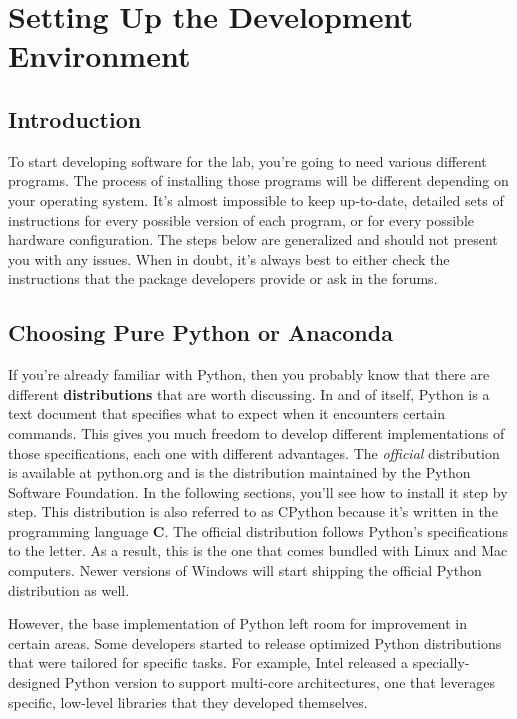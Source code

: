 \chapter[Setting Up]{Setting Up the Development Environment}\label{ch:setting-up}
\section{Introduction}\label{sec:setting-up-introduction}
To start developing software for the lab, you're going to need various different programs. The process of installing those programs will be different depending on your operating system. It's almost impossible to keep up-to-date, detailed sets of instructions for every possible version of each program, or for every possible hardware configuration. The steps below are generalized and should not present you with any issues. When in doubt, it's always best to either check the instructions that the package developers provide or ask in the forums.

\section{Choosing Pure Python or Anaconda}\label{sec:python-or-anaconda}
If you're already familiar with Python, then you probably know that there are different \textbf{distributions} that are worth discussing. In and of itself, Python is a text document that specifies what to expect when it encounters certain commands. This gives you much freedom to develop different implementations of those specifications, each one with different advantages. The \emph{official} distribution is available at python.org and is the distribution maintained by the Python Software Foundation. In the following sections, you'll see how to install it step by step. This distribution is also referred to as CPython because it's written in the programming language \textbf{C}. The official distribution follows Python's specifications to the letter. As a result, this is the one that comes bundled with Linux and Mac computers. Newer versions of Windows will start shipping the official Python distribution as well.

However, the base implementation of Python left room for improvement in certain areas. Some developers started to release optimized Python distributions that were tailored for specific tasks. For example, Intel released a specially-designed Python version to support multi-core architectures, one that leverages specific, low-level libraries that they developed themselves.

